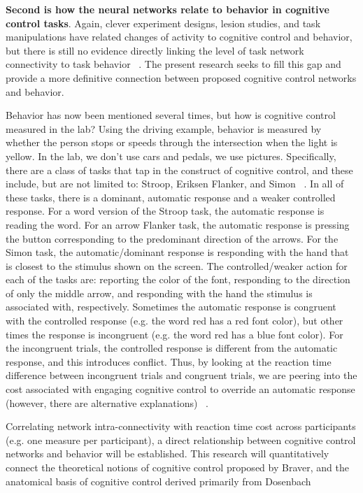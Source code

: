 \documentclass[phd,appendix,figures]{uithesis}
\begin{document}
\textbf{Second is how the neural networks relate to behavior in cognitive control tasks}.
Again, clever experiment designs, lesion studies, and task manipulations have related changes of activity to cognitive control and behavior, but there is still no evidence directly linking the level of task network connectivity to task behavior ~\citep{Nomura2010,Egner2004,Gonthier2016a,Braver2010,Huang2017}.
The present research seeks to fill this gap and provide a more definitive connection between proposed cognitive control networks and behavior.

Behavior has now been mentioned several times, but how is cognitive control measured in the lab?
Using the driving example, behavior is measured by whether the person stops or speeds through the intersection when the light is yellow.
In the lab, we don't use cars and pedals, we use pictures.
Specifically, there are a class of tasks that tap in the construct of cognitive control, and these include, but are not limited to: Stroop, Eriksen Flanker, and Simon ~\citep{Simon1967,Eriksen1974a,Stroop1935}.
In all of these tasks, there is a dominant, automatic response and a weaker controlled response. 
For a word version of the Stroop task, the automatic response is reading the word.
For an arrow Flanker task, the automatic response is pressing the button corresponding to the predominant direction of the arrows.
For the Simon task, the automatic/dominant response is responding with the hand that is closest to the stimulus shown on the screen.
The controlled/weaker action for each of the tasks are: reporting the color of the font, responding to the direction of only the middle arrow, and responding with the hand the stimulus is associated with, respectively.
Sometimes the automatic response is congruent with the controlled response (e.g. the word red has a red font color), but other times the response is incongruent (e.g. the word red has a blue font color).
For the incongruent trials, the controlled response is different from the automatic response, and this introduces conflict.
Thus, by looking at the reaction time difference between incongruent trials and congruent trials, we are peering into the cost associated with engaging cognitive control to override an automatic response (however, there are alternative explanations) ~\citep{Hommel2011}. 

Correlating network intra-connectivity with reaction time cost across participants (e.g. one measure per participant), a direct relationship between cognitive control networks and behavior will be established.
This research will quantitatively connect the theoretical notions of cognitive control proposed by Braver, and the anatomical basis of cognitive control derived primarily from Dosenbach ~\citep{Braver2008,Dosenbach2007}
\end{document}
